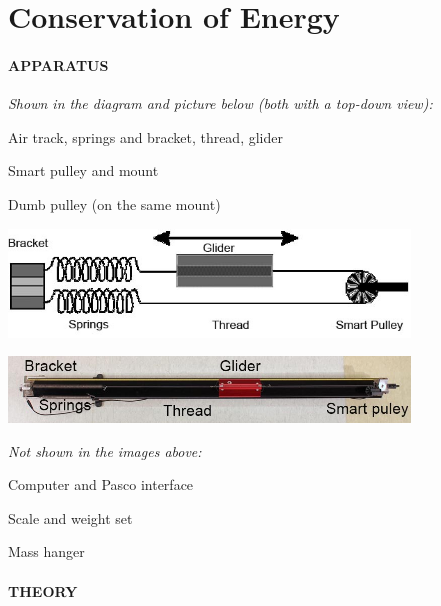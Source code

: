 
\vspace{-5ex}\part*{Conservation of Energy}

\subsection*{APPARATUS}

\noindent\textit{Shown in the diagram and picture below (both with a top-down view):}
\squishlist
\item Air track, springs and bracket, thread, glider
\item Smart pulley and mount
\item Dumb pulley (on the same mount)
\squishend
\begin{center} \includegraphics*[width=0.8\textwidth]{imgs/6labs/6Alab/6Aexp4/6A_exp4_fig1_fx.jpg} \end{center}
\begin{center} \includegraphics*[width=0.8\textwidth]{imgs/6labs/6Alab/6Aexp4/6A_EXP4-fig2a_pdf.jpg} \end{center}
\noindent\textit{Not shown in the images above:}
\squishlist
\item Computer and Pasco interface
\item Scale and weight set
\item Mass hanger
\squishend

\subsection*{THEORY}

